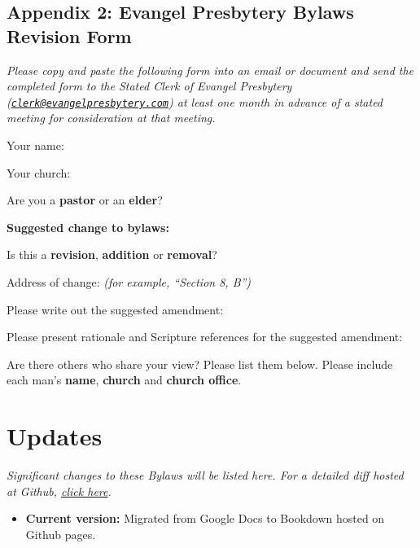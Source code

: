 \documentclass[
]{book}
\providecommand{\tightlist}{%
  \setlength{\itemsep}{0pt}\setlength{\parskip}{0pt}}
\begin{document}
\hypertarget{appendix-2-evangel-presbytery-bylaws-revision-form}{%
\section{Appendix 2: Evangel Presbytery Bylaws Revision Form}\label{appendix-2-evangel-presbytery-bylaws-revision-form}}

\emph{Please copy and paste the following form into an email or document and send the completed form to the Stated Clerk of Evangel Presbytery (\href{mailto:clerk@evangelpresbytery.com}{\nolinkurl{clerk@evangelpresbytery.com}}) at least one month in advance of a stated meeting for consideration at that meeting.}

Your name:

Your church:

Are you a \textbf{pastor} or an \textbf{elder}?

\textbf{Suggested change to bylaws:}

Is this a \textbf{revision}, \textbf{addition} or \textbf{removal}?

Address of change: \emph{(for example, ``Section 8, B'')}

Please write out the suggested amendment:

Please present rationale and Scripture references for the suggested amendment:

Are there others who share your view? Please list them below. Please include each man's \textbf{name}, \textbf{church} and \textbf{church office}.

\hypertarget{updates}{%
\chapter{Updates}\label{updates}}

\emph{Significant changes to these Bylaws will be listed here. For a detailed diff hosted at Github, \href{https://github.com/Evangel-Presbytery/evangel-bylaws}{click here}.}

\begin{itemize}
\tightlist
\item
  \textbf{Current version:} Migrated from Google Docs to Bookdown hosted on Github pages.
\end{itemize}
\end{document}
